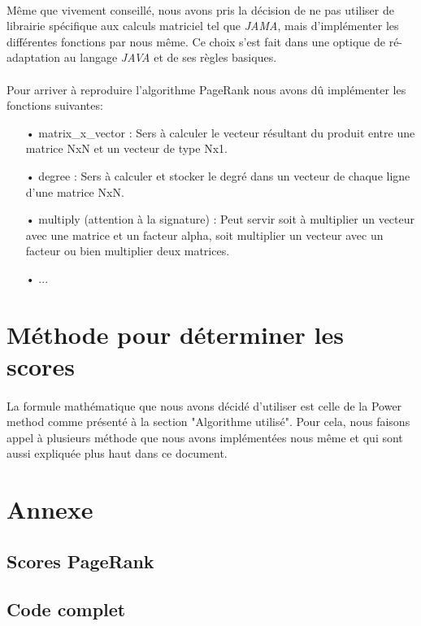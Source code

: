 \documentclass[10pt,a4paper]{article}
\begin{document}
\paragraph{}Même que vivement conseillé, nous avons pris la décision de ne pas utiliser de librairie spécifique aux calculs matriciel tel que \textit{JAMA}, mais d'implémenter les différentes fonctions par nous même. Ce choix s'est fait dans une optique de ré-adaptation au langage \textit{JAVA} et de ses règles basiques.

\paragraph{}Pour arriver à reproduire l'algorithme PageRank nous avons dû implémenter les fonctions suivantes:

\hspace{1.5cm}

\begin{itemize}
    \item[•] matrix\_x\_vector : Sers à calculer le vecteur résultant du produit entre une matrice NxN et un vecteur de type Nx1.
    \item[•] degree : Sers à calculer et stocker le degré dans un vecteur de chaque ligne d'une matrice NxN.
    \item[•] multiply (attention à la signature) : Peut servir soit à multiplier un vecteur avec une matrice et un facteur alpha, soit multiplier un vecteur avec un facteur ou bien multiplier deux matrices.
    \item[•] ...
\end{itemize}

\section{Méthode pour déterminer les scores}


\paragraph{}La formule mathématique que nous avons décidé d'utiliser est celle de la Power method comme présenté à la section "Algorithme utilisé". Pour cela, nous faisons appel à plusieurs méthode que nous avons implémentées nous même et qui sont aussi expliquée plus haut dans ce document.

\section{Annexe}

\subsection{Scores PageRank}


\subsection{Code complet}

\end{document}
